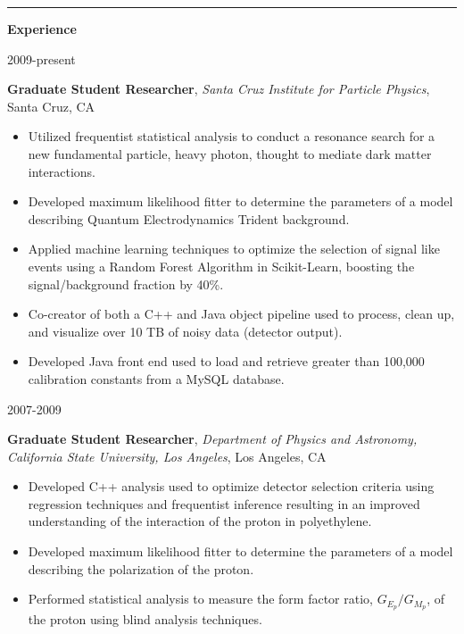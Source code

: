 \documentclass[11pt]{article}
\newcommand{\resumesection}[1] {
    \noindent
    \textcolor{indigodye}{\rule{.15\textwidth}{.1in} \hspace{0.01 \textwidth} \textbf{\Large{#1}}} \newline
}
\newcommand{\experienceentry}[5] { 
    \noindent
    \begin{minipage}[t]{0.15\textwidth} \begin{flushright} #1 \end{flushright} \end{minipage} \hspace{0.01\textwidth}
    \begin{minipage}[t]{0.84\textwidth} 
        \textbf{#2}, \emph{#3}, #4 
        #5
    \end{minipage}
}
\begin{document}
    \resumesection{Experience}
        \experienceentry{2009-present}
                        {Graduate Student Researcher}
                        {Santa Cruz Institute for Particle Physics}
                        {Santa Cruz, CA}
                        {
                            \begin{itemize}[label=\textcolor{indigodye}{$\circ$}, noitemsep, nolistsep, leftmargin=*]
                              \item Utilized frequentist statistical analysis to conduct a resonance search for a new
                                    fundamental particle, heavy photon, thought to mediate dark matter 
                                    interactions.
                              \item Developed maximum likelihood fitter to determine the parameters of a model 
                                    describing Quantum Electrodynamics Trident background.
                              \item Applied machine learning techniques to optimize the selection of signal like 
                                    events using a Random Forest Algorithm in Scikit-Learn, boosting the 
                                    signal/background fraction by 40\%.
                              \item Co-creator of both a C++ and Java object pipeline used to process, clean up,
                                    and visualize over 10 TB of noisy data (detector output).
                              \item Developed Java front end used to load and retrieve greater than 100,000 
                                    calibration constants from a MySQL database.
                          \end{itemize}
                        }
        \experienceentry{2007-2009}
                        {Graduate Student Researcher}
                        {Department of Physics and Astronomy, California State University, Los Angeles}
                        {Los Angeles, CA}
                        {
                          \begin{itemize}[label=\textcolor{indigodye}{$\circ$}, noitemsep, nolistsep, leftmargin=*]
                            \item Developed C++ analysis used to optimize detector selection criteria using regression
                                  techniques and frequentist inference resulting in an improved understanding of the
                                  interaction of the proton in polyethylene.
                            \item Developed maximum likelihood fitter to determine the parameters of a model describing
                                  the polarization of the proton.
                            \item Performed statistical analysis to measure the form factor ratio, $G_{E_p}/G_{M_p}$, of
                                  the proton using blind analysis techniques.
                          \end{itemize}
                        } 
\end{document}
